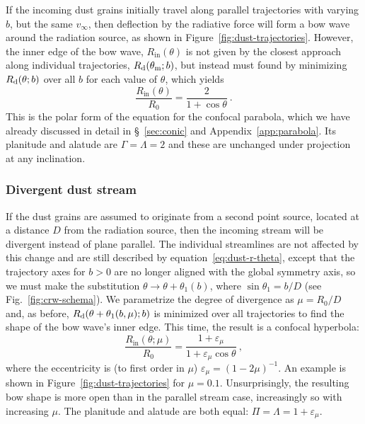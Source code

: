 If the incoming dust grains initially travel along parallel
trajectories with varying \(b\), but the same \(v_\infty\), then deflection
by the radiative force will form a bow wave around the radiation
source, as shown in Figure~\ref{fig:dust-trajectories}.  However, the
inner edge of the bow wave, \(R_{\text{in}}(\theta)\) is not given by the
closest approach along individual trajectories, \(R_{\text{d}}(\theta_{\text{m}}; b)\),
but instead must found by minimizing \(R_{\text{d}}(\theta; b)\) over all
\(b\) for each value of \(\theta\), which yields
\begin{equation}
  \label{eq:dust-r-in}
  \frac{R_{\text{in}}(\theta)} {R_0} = \frac{2}{1 + \cos\theta} \ .
\end{equation}
This is the polar form of the equation for the confocal parabola,
which we have already discussed in detail in \S~\ref{sec:conic} and
Appendix~\ref{app:parabola}.  Its planitude and alatude are
\(\Gamma = \Lambda = 2\) and these are unchanged under projection at any
inclination.


\subsubsection{Divergent dust stream}
\label{sec:dust-divergent}

If the dust grains are assumed to originate from a second point
source, located at a distance \(D\) from the radiation source, then
the incoming stream will be divergent instead of plane parallel.  The
individual streamlines are not affected by this change and are still
described by equation~\eqref{eq:dust-r-theta}, except that the
trajectory axes for \(b > 0\) are no longer aligned with the global
symmetry axis, so we must make the substitution
\(\theta \to \theta + \theta_1(b)\), where \(\sin \theta_1 = b / D\) (see
Fig.~\ref{fig:crw-schema}). We parametrize the degree of divergence as
\(\mu = R_0 / D\) and, as before, \(R_{\text{d}}(\theta + \theta_1(b, \mu); b)\) is
minimized over all trajectories to find the shape of the bow wave's
inner edge.  This time, the result is a confocal hyperbola:
\begin{equation}
  \label{eq:dust-divergent-r-in}
  \frac{R_{\text{in}}(\theta; \mu)} {R_0} = \frac{1 + \varepsilon_\mu}{1 + \varepsilon_\mu\cos\theta} \ ,
\end{equation}
where the eccentricity is (to first order in \(\mu\))
\( \varepsilon_\mu = (1 - 2\mu)^{-1}\).  An example is shown in
Figure~\ref{fig:dust-trajectories} for \(\mu = 0.1\).  Unsurprisingly,
the resulting bow shape is more open than in the parallel stream case,
increasingly so with increasing \(\mu\).  The planitude and alatude are
both equal: \(\Pi = \Lambda = 1 + \varepsilon_\mu\).

